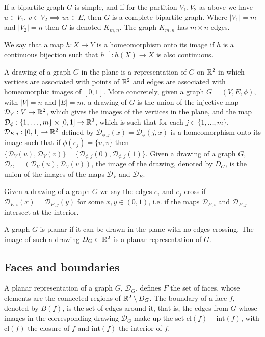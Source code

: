 \documentclass[10pt, a4paper]{article}
\begin{document}
If a bipartite graph $G$ is simple,
and if for the partition $V_1, V_2$ as above we have $u \in V_1$,
$v \in V_2 \implies uv \in E$,
then $G$ is a complete bipartite graph.
Where $|V_1| = m$ and $|V_2| = n$ then $G$ is denoted $K_{m, n}$.
The graph $K_{m, n}$ has $m \times n$ edges.

We say that a map $h : X \rightarrow Y$ is a homeomorphism onto its image if $h$ is a continuous bijection such that $h ^ {-1} : h(X) \rightarrow X$ is also continuous.

\begin{definition}
    A drawing of a graph $G$ in the plane is a representation of $G$ on $\mathbb{R} ^ 2$ in which vertices are associated with points of $\mathbb{R} ^ 2$ and edges are associated with homeomorphic images of $[0, 1]$.
    More concretely,
    given a graph $G = (V, E, \phi)$,
    with $|V| = n$ and $|E| = m$,
    a drawing of $G$ is the union of the injective map $\mathcal{D}_V : V \rightarrow \mathbb{R} ^ 2$,
    which gives the images of the vertices in the plane,
    and the map $\mathcal{D}_{\phi} : \{1, \dotsc, m\} \times [0, 1] \rightarrow \mathbb{R} ^ 2$,
    which is such that for each $j \in \{1, \dotsc, m\}$,
    $\mathcal{D}_{E, j} : [0, 1] \rightarrow \mathbb{R} ^ 2$ defined by $\mathcal{D}_{\phi, j}(x) = \mathcal{D}_{\phi}(j, x)$ is a homeomorphism onto its image such that if $\phi(e_j) = \{u, v\}$ then $\{\mathcal{D}_V(u), \mathcal{D}_V(v)\} = \{\mathcal{D}_{\phi, j}(0), \mathcal{D}_{\phi, j}(1)\}$.
    Given a drawing of a graph $G$,
    $\mathcal{D}_G = (\mathcal{D}_V(u), \mathcal{D}_V(v))$,
    the image of the drawing,
    denoted by $D_G$,
    is the union of the images of the maps $\mathcal{D}_V$ and $\mathcal{D}_E$.
\end{definition}

Given a drawing of a graph $G$ we say the edges $e_i$ and $e_j$ cross if $\mathcal{D}_{E, i}(x) = \mathcal{D}_{E, j}(y)$ for some $x, y \in (0, 1)$,
i.e.
if the maps $\mathcal{D}_{E, i}$ and $\mathcal{D}_{E, j}$ intersect at the interior.

\begin{definition}
    A graph $G$ is planar if it can be drawn in the plane with no edges crossing.
    The image of such a drawing $D_G \subset \mathbb{R} ^ 2$ is a planar representation of $G$.
\end{definition}

\subsection{Faces and boundaries}
\begin{definition}
    A planar representation of a graph $G$,
    $\mathcal{D}_G$,
    defines $F$ the set of faces,
    whose elements are the connected regions of $\mathbb{R} ^ 2 \setminus D_G$.
    The boundary of a face $f$,
    denoted by $B(f)$,
    is the set of edges around it,
    that is,
    the edges from $G$ whose images in the corresponding drawing $\mathcal{D}_G$ make up the set $\mathrm{cl}(f) - \mathrm{int}(f)$,
    with $\mathrm{cl}(f)$ the closure of $f$ and $\mathrm{int}(f)$ the interior of $f$.
\end{definition}
\end{document}
